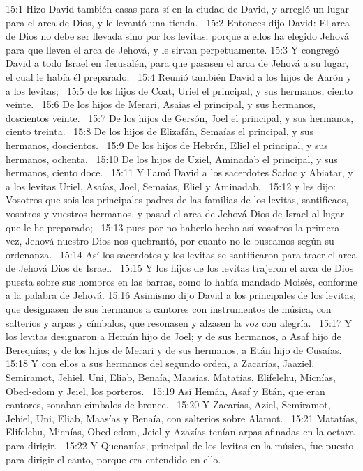 15:1 Hizo David también casas para sí en la ciudad de David, y arregló un lugar para el arca de Dios, y le levantó una tienda.  
15:2 Entonces dijo David: El arca de Dios no debe ser llevada sino por los levitas; porque a ellos ha elegido Jehová para que lleven el arca de Jehová, y le sirvan perpetuamente. 
15:3 Y congregó David a todo Israel en Jerusalén, para que pasasen el arca de Jehová a su lugar, el cual le había él preparado.  
15:4 Reunió también David a los hijos de Aarón y a los levitas;  
15:5 de los hijos de Coat, Uriel el principal, y sus hermanos, ciento veinte.  
15:6 De los hijos de Merari, Asaías el principal, y sus hermanos, doscientos veinte.  
15:7 De los hijos de Gersón, Joel el principal, y sus hermanos, ciento treinta.  
15:8 De los hijos de Elizafán, Semaías el principal, y sus hermanos, doscientos.  
15:9 De los hijos de Hebrón, Eliel el principal, y sus hermanos, ochenta.  
15:10 De los hijos de Uziel, Aminadab el principal, y sus hermanos, ciento doce.  
15:11 Y llamó David a los sacerdotes Sadoc y Abiatar, y a los levitas Uriel, Asaías, Joel, Semaías, Eliel y Aminadab,  
15:12 y les dijo: Vosotros que sois los principales padres de las familias de los levitas, santificaos, vosotros y vuestros hermanos, y pasad el arca de Jehová Dios de Israel al lugar que le he preparado;  
15:13 pues por no haberlo hecho así vosotros la primera vez, Jehová nuestro Dios nos quebrantó, por cuanto no le buscamos según su ordenanza.  
15:14 Así los sacerdotes y los levitas se santificaron para traer el arca de Jehová Dios de Israel.  
15:15 Y los hijos de los levitas trajeron el arca de Dios puesta sobre sus hombros en las barras, como lo había mandado Moisés, conforme a la palabra de Jehová. 
15:16 Asimismo dijo David a los principales de los levitas, que designasen de sus hermanos a cantores con instrumentos de música, con salterios y arpas y címbalos, que resonasen y alzasen la voz con alegría.  
15:17 Y los levitas designaron a Hemán hijo de Joel; y de sus hermanos, a Asaf hijo de Berequías; y de los hijos de Merari y de sus hermanos, a Etán hijo de Cusaías.  
15:18 Y con ellos a sus hermanos del segundo orden, a Zacarías, Jaaziel, Semiramot, Jehiel, Uni, Eliab, Benaía, Maasías, Matatías, Elifelehu, Micnías, Obed-edom y Jeiel, los porteros.  
15:19 Así Hemán, Asaf y Etán, que eran cantores, sonaban címbalos de bronce.  
15:20 Y Zacarías, Aziel, Semiramot, Jehiel, Uni, Eliab, Maasías y Benaía, con salterios sobre Alamot.  
15:21 Matatías, Elifelehu, Micnías, Obed-edom, Jeiel y Azazías tenían arpas afinadas en la octava para dirigir.  
15:22 Y Quenanías, principal de los levitas en la música, fue puesto para dirigir el canto, porque era entendido en ello.  
